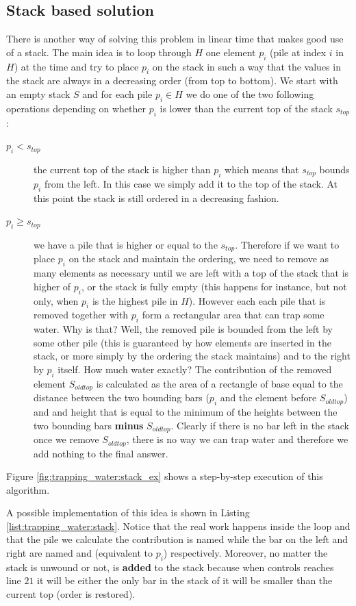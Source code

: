 \subsection{Stack based solution}
\label{trapping_water:sec:stack}
There is another way of solving this problem in linear time that makes good use of a stack. The main idea is to loop through $H$ one element $p_i$ (pile at index $i$ in $H$) at the time and try to place $p_i$ on the stack in such a way that the values in the stack are always in a decreasing order (from top to bottom).
We start with an empty stack $S$ and for each pile $p_i \in H$ we do one of the two following operations depending on whether $p_i$  is lower than the current top of the stack $s_{top}$:
\begin{description}
	\item[$p_i < s_{top}$] the current top of the stack is higher than $p_i$ which means that $s_{top}$ bounds $p_i$ from the left. In this case we simply add it to the top of the stack. At this point the stack is still ordered in a decreasing fashion.
	\item[$p_i \geq s_{top}$] we have a pile that is higher or equal to the $s_{top}$. Therefore if we want to place $p_i$ on the stack and maintain the ordering, we need to remove as many elements as necessary until we are left with a top of the stack that is higher of $p_i$, or the stack is fully empty (this happens for instance, but not only, when $p_i$ is the highest pile in $H$).
	However each each pile that is removed together with $p_i$  form a rectangular area that can trap some water. Why is that? Well, the removed pile is bounded from the left by some other pile (this is guaranteed by how elements are inserted in the stack, or more simply by the ordering the stack maintains) and to the right by $p_i$ itself. 
	How much water exactly? 
	The contribution of the removed element $S_{oldtop}$ is calculated as the area of a rectangle of base equal to the distance between the two bounding bars ($p_i$ and the element before $S_{oldtop}$) and and height that is equal to the minimum of the heights between the two bounding bars \textbf{minus} $S_{oldtop}$. Clearly if there is no bar left in the stack once we remove $S_{oldtop}$, there is no way we can trap water and therefore we add nothing to the final answer. 
\end{description}
Figure \ref{fig:trapping_water:stack_ex} shows a step-by-step  execution of this algorithm.

A possible implementation of this idea is shown in Listing \ref{list:trapping_water:stack}.
Notice that the real work happens inside the  loop and that the pile we calculate the contribution is named  while the bar on the left and right are named  and  (equivalent to $p_i$) respectively. 
Moreover, no matter the stack is unwound or not,  is \textbf{added} to the stack because when controls reaches line $21$ it will be either the only bar in the stack of it will be smaller than the current top (order is restored).



